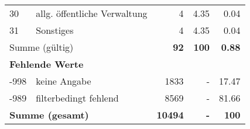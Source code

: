 \begin{longtable}{lXrrr}
        30 & \multicolumn{1}{X}{allg. öffentliche Verwaltung} & %
          \num{4} &
          \num[round-mode=places,round-precision=2]{4.35} &
          \num[round-mode=places,round-precision=2]{0.04} \\

        31 & \multicolumn{1}{X}{Sonstiges} & %
          \num{4} &
          \num[round-mode=places,round-precision=2]{4.35} &
          \num[round-mode=places,round-precision=2]{0.04} \\

     \midrule
     \multicolumn{2}{l}{Summe (gültig)} &
       \textbf{\num{92}} &
     \textbf{\num{100}} &
       \textbf{\num[round-mode=places,round-precision=2]{0.88}} \\
     \multicolumn{5}{l}{\textbf{Fehlende Werte}}\\
       -998 &
       keine Angabe &
         \num{1833} &
        - &
         \num[round-mode=places,round-precision=2]{17.47} \\
       -989 &
       filterbedingt fehlend &
         \num{8569} &
        - &
         \num[round-mode=places,round-precision=2]{81.66} \\
     \midrule
     \multicolumn{2}{l}{\textbf{Summe (gesamt)}} &
          \textbf{\num{10494}} &
        \textbf{-} &
        \textbf{\num{100}} \\
     \bottomrule
     \end{longtable}
     
